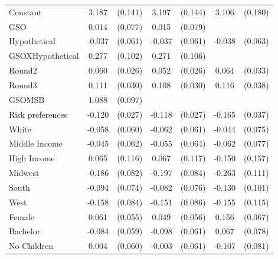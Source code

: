 \documentclass[12pt]{article}
\newcommand{\sym}[1]{\rlap{$^{#1}$}}
\begin{document}
\begin{table}[H]
{\begin{tabular}{l*{3}{cc}}
Constant    &       3.187\sym{***}&     (0.141)&       3.197\sym{***}&     (0.144)&       3.106\sym{***}&     (0.180)\\
GSO         &       0.014         &     (0.077)&       0.015         &     (0.079)&                     &            \\
Hypothetical&      -0.037         &     (0.061)&      -0.037         &     (0.061)&      -0.038         &     (0.063)\\
GSOXHypothetical&       0.277\sym{***}&     (0.102)&       0.271\sym{**} &     (0.106)&                     &            \\
Round2      &       0.060\sym{**} &     (0.026)&       0.052\sym{**} &     (0.026)&       0.064\sym{*}  &     (0.033)\\
Round3      &       0.111\sym{***}&     (0.030)&       0.108\sym{***}&     (0.030)&       0.116\sym{***}&     (0.038)\\
GSOMSB    &       1.088\sym{***}&     (0.097)&                     &            &                     &            \\
Risk preferences&      -0.120\sym{***}&     (0.027)&      -0.118\sym{***}&     (0.027)&      -0.165\sym{***}&     (0.037)\\
White       &      -0.058         &     (0.060)&      -0.062         &     (0.061)&      -0.044         &     (0.075)\\
Middle Income&      -0.045         &     (0.062)&      -0.055         &     (0.064)&      -0.062         &     (0.077)\\
High Income &       0.065         &     (0.116)&       0.067         &     (0.117)&      -0.150         &     (0.157)\\
Midwest     &      -0.186\sym{**} &     (0.082)&      -0.197\sym{**} &     (0.084)&      -0.263\sym{**} &     (0.111)\\
South       &      -0.094         &     (0.074)&      -0.082         &     (0.076)&      -0.130         &     (0.101)\\
West        &      -0.158\sym{*}  &     (0.084)&      -0.151\sym{*}  &     (0.086)&      -0.155         &     (0.115)\\
Female      &       0.061         &     (0.055)&       0.049         &     (0.056)&       0.156\sym{**} &     (0.067)\\
Bachelor    &      -0.084         &     (0.059)&      -0.098         &     (0.061)&       0.067         &     (0.078)\\
No Children &       0.004         &     (0.060)&      -0.003         &     (0.061)&      -0.107         &     (0.081)\\

\end{tabular}}
\end{table}
\end{document}
